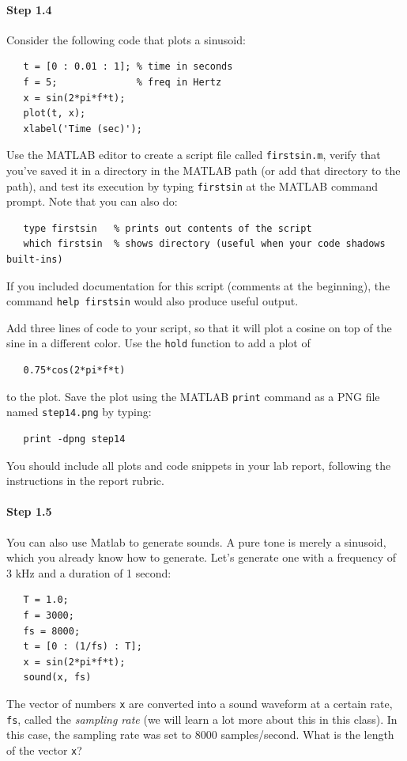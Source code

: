 \paragraph{Step 1.4} Consider the following code that plots a
sinusoid:
\begin{verbatim}
   t = [0 : 0.01 : 1]; % time in seconds
   f = 5;              % freq in Hertz
   x = sin(2*pi*f*t);
   plot(t, x);
   xlabel('Time (sec)');
\end{verbatim}
Use the MATLAB editor to create a script file called
\texttt{firstsin.m}, verify that you've saved it in a directory in the
MATLAB path (or add that directory to the path), and test its
execution by typing \texttt{firstsin} at the MATLAB command
prompt. Note that you can also do:
\begin{verbatim}
   type firstsin   % prints out contents of the script
   which firstsin  % shows directory (useful when your code shadows built-ins)
\end{verbatim}
If you included documentation for this script (comments at the
beginning), the command \verb|help firstsin| would also produce useful
output.

Add three lines of code to your script, so that it will plot a cosine
on top of the sine in a different color. Use the \texttt{hold}
function to add a plot of
\begin{verbatim}
   0.75*cos(2*pi*f*t)
\end{verbatim}
to the plot. Save the plot using the MATLAB \texttt{print} command as
a PNG file named \texttt{step14.png} by typing:
\begin{verbatim}
   print -dpng step14
\end{verbatim}
You should include all plots and code snippets in your lab report,
following the instructions in the report rubric.


\paragraph{Step 1.5} You can also use Matlab to generate sounds. A
pure tone is merely a sinusoid, which you already know how to
generate. Let's generate one with a frequency of 3 kHz and a duration
of 1 second:
\begin{verbatim}
   T = 1.0;
   f = 3000;
   fs = 8000;
   t = [0 : (1/fs) : T];
   x = sin(2*pi*f*t);
   sound(x, fs)
\end{verbatim}
The vector of numbers \texttt{x} are converted into a sound waveform
at a certain rate, \verb|fs|, called the \emph{sampling rate} (we will
learn a lot more about this in this class). In this case, the sampling
rate was set to 8000 samples/second. What is the length of
the vector \texttt{x}?

